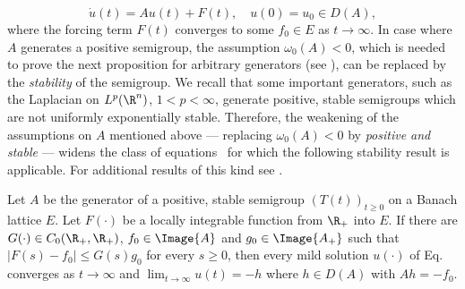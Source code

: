 \begin{equation}\label{eq:c4-1.6}
\dot{u}(t) = Au(t) + F(t), \quad u(0) = u_{0} \in D(A) ,
\end{equation}
where the forcing term $F(t)$ converges to some $f_{0} \in E$ as $t \to \infty$.
In case where $A$ generates a positive semigroup, the assumption \emph{$\omega_{0}(A) < 0$}, which is needed to prove the next proposition for arbitrary generators (see \textcite[ Theorem~4.4.4]{pazy:1983}), can be replaced by the \emph{stability} of the semigroup.
We recall that some important generators, such as the Laplacian on $L^{p}(\R^{n})$, $1 < p < \infty$, generate positive, stable semigroups which are not uniformly exponentially stable.
Therefore, the weakening of the assumptions on $A$ mentioned above --- \ie  replacing \emph{$\omega_{0}(A) < 0$} by \emph{positive and stable} --- widens the class of equations~ for which the following stability result is applicable.
For additional results of this kind see \textcite{neubrander:1985b}.
\begin{proposition}\label{prop:c4-1.11}
Let $A$ be the generator of a positive, stable semigroup $(T(t))_{t \geq 0}$ on a Banach lattice $E$.
Let $F(\cdot)$ be a locally integrable function from $\R_{+}$ into $E$.
If there are $G(\cdot) \in C_{0}(\R_{+},\R_{+})$, $f_{0} \in  \Image{A}$ and $g_{0} \in \Image{A_{+}}$ such that $|F(s) - f_{0}| \leq G(s)g_{0}$ for every $s \geq 0$, then every mild solution $u(\cdot)$ of Eq.~ converges as $t \to \infty$ and $\lim_{t \to \infty} u(t) = -h$ where $h \in D(A)$ with $Ah = -f_{0}$.
\end{proposition}
